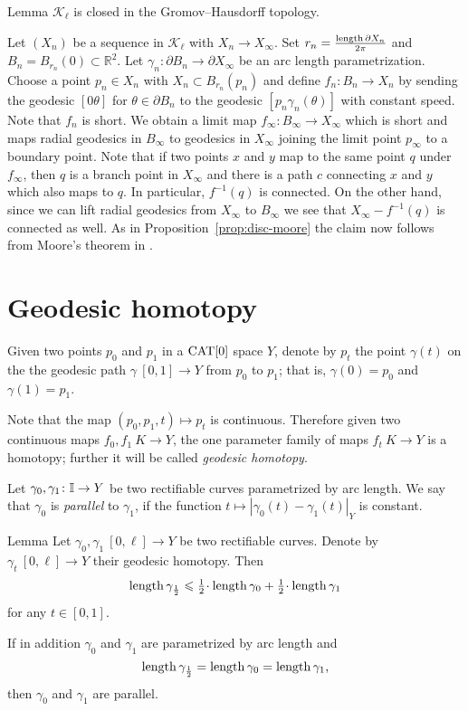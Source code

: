 \documentclass{article}
\begin{document}
\begin{thm}{Lemma}\label{lem:closed}
$\mathcal{K}_\ell$ is closed in the Gromov--Hausdorff topology.
\end{thm}

Let $(X_n)$ be a sequence in $\mathcal{K}_\ell$ with $X_n\to X_\infty$. 
Set $r_n=\frac{\mathop{\rm length}\nolimits\partial X_n}{2\pi}$ 
and $B_n=B_{r_n}(0)\subset \mathbb{R}^2$.
Let $\gamma_n:\partial B_n\to\partial X_\infty$ be an arc length parametrization.
Choose a point $p_n\in X_n$ with $X_n\subset B_{r_n}(p_n)$ and define
$f_n:B_n\to X_n$ by sending the geodesic $[0\theta]$ for $\theta\in\partial B_n$ to the geodesic $[p_n\gamma_n(\theta)]$ with constant speed. 
Note that $f_n$ is short.
We obtain a limit map $f_\infty:B_\infty\to X_\infty$ which is short and maps radial geodesics in $B_\infty$ to geodesics in $X_\infty$ joining the limit point $p_\infty$
to a boundary point.
Note that if two points $x$  and $y$ map to the same point $q$ under $f_\infty$, then $q$ is a branch point in $X_\infty$ and there is a path $c$ connecting 
$x$ and $y$ which also maps to $q$. 
In particular, $f^{-1}(q)$ is connected.
On the other hand, since we can lift radial geodesics from $X_\infty$ to $B_\infty$ we see that $X_\infty-f^{-1}(q)$
is connected as well.
As in Proposition~\ref{prop:disc-moore} the claim now follows from Moore's theorem in \cite{moore}.
\qeds

\section{Geodesic homotopy}

Given two points $p_0$ and $p_1$ in a $\mathop{\rm CAT}\nolimits[0]$ space $Y$,
denote by $p_t$ the point $\gamma(t)$ on the 
the geodesic path $\gamma\:[0,1]\to Y$ from $p_0$ to $p_1$;
that is, $\gamma(0)=p_0$ and $\gamma(1)=p_1$.

Note that the map $(p_0,p_1,t)\mapsto p_t$ is continuous.
Therefore given two continuous maps $f_0,f_1\:K\to Y$,
the one parameter family of maps $f_t\:K\to Y$ 
is a homotopy;
further it will be called \emph{geodesic homotopy}.

Let $\gamma_{0}, \gamma_1\colon\mathbb{I}\to Y$ be two rectifiable curves parametrized by arc length. 
We say that  $\gamma_{0}$ is {\em parallel} to $\gamma_{1}$, if the function $t\mapsto |\gamma_{0}(t)-\gamma_{1}(t)|_Y$ is constant.


\begin{thm}{Lemma}\label{lem:parpaths}
Let $\gamma_0,\gamma_1\:[0,\ell]\to Y$ be two rectifiable curves. 
Denote by $\gamma_t\:[0,\ell]\to Y$ their geodesic homotopy.
Then
\[\length\gamma_{\frac12}
\le \tfrac12\cdot\length\gamma_0 +\tfrac12\cdot\length\gamma_1\]
for any $t\in [0,1]$.

If in addition $\gamma_0$ and $\gamma_1$ are parametrized by arc length and 
\[\mathop{\rm length}\nolimits\gamma_{\frac12}
=\mathop{\rm length}\nolimits\gamma_0
=\mathop{\rm length}\nolimits\gamma_1,\] 
then $\gamma_{0}$ and $\gamma_{1}$ are parallel. 
\end{thm}
\end{document}
